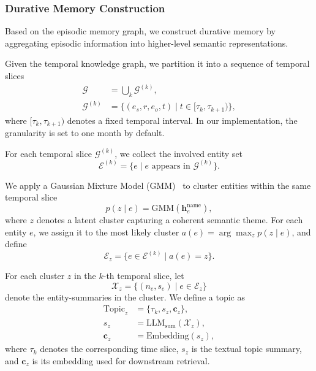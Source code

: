 \documentclass[11pt]{article}
\begin{document}
\subsubsection{Durative Memory Construction}

Based on the episodic memory graph, we construct durative memory by aggregating episodic information into higher-level semantic representations. 

Given the temporal knowledge graph, we partition it into a sequence of temporal slices
\begin{equation}
\begin{aligned}
\mathcal{G} &= \bigcup_{k} \mathcal{G}^{(k)}, \\
\mathcal{G}^{(k)} &= \{ (e_s, r, e_o, t) \mid t \in [\tau_k, \tau_{k+1}) \},
\end{aligned}
\end{equation}
where $[\tau_k, \tau_{k+1})$ denotes a fixed temporal interval. In our implementation, the granularity is set to one month by default.

For each temporal slice $\mathcal{G}^{(k)}$, we collect the involved entity set
\begin{equation}
\mathcal{E}^{(k)} = \{ e \mid e \text{ appears in } \mathcal{G}^{(k)} \}.
\end{equation}


We apply a Gaussian Mixture Model (GMM)~\cite{huang_retrieval-augmented_2025} to cluster entities within the same temporal slice
\begin{equation}
p(z \mid e) = \mathrm{GMM}(\mathbf{h}^{\mathrm{name}}_e),
\end{equation}
where $z$ denotes a latent cluster capturing a coherent semantic theme. For each entity $e$, we assign it to the most likely cluster $a(e)=\arg\max_{z} p(z\mid e)$, and define
\begin{equation}
\mathcal{E}_z = \{ e \in \mathcal{E}^{(k)} \mid a(e)=z \}.
\end{equation}

For each cluster $z$ in the $k$-th temporal slice, let
\begin{equation}
\mathcal{X}_z = \{ (n_e, s_e) \mid e \in \mathcal{E}_z \}
\end{equation}
denote the entity-summaries in the cluster. We define a topic as
\begin{equation}
\begin{aligned}
\mathrm{Topic}_z &= \{ \tau_k, s_z, \mathbf{c}_z \}, \\
s_z &= \mathrm{LLM}_{\mathrm{sum}}(\mathcal{X}_z), \\
\mathbf{c}_z &= \mathrm{Embedding}(s_z),
\end{aligned}
\end{equation}
where $\tau_k$ denotes the corresponding time slice, $s_z$ is the textual topic summary, and $\mathbf{c}_z$ is its embedding used for downstream retrieval.
\end{document}
